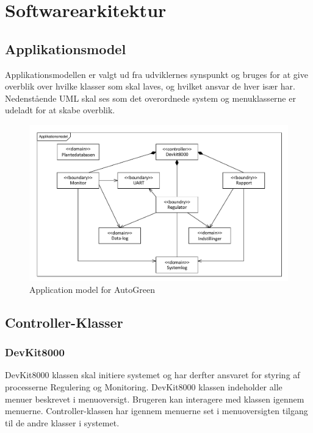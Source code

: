 \section{Softwarearkitektur}

\subsection{Applikationsmodel}

Applikationsmodellen er valgt ud fra udviklernes synspunkt og bruges for at give overblik over hvilke klasser som skal laves, og hvilket ansvar de hver især har. Nedenstående UML skal ses som det overordnede system og menuklasserne er udeladt for at skabe overblik. 

\begin{figure}[!h]
\centering 
\includegraphics[scale=0.8] {../fig/UML_autogreen.pdf}
\caption{Application model for AutoGreen}
\label{fig:UML}
\end{figure}

\subsection{Controller-Klasser}

\subsubsection{DevKit8000}

DevKit8000 klassen skal initiere systemet og har derfter ansvaret for styring af processerne Regulering og Monitoring.
DevKit8000 klassen indeholder alle menuer beskrevet i menuoversigt. Brugeren kan interagere med klassen igennem menuerne.
Controller-klassen har igennem menuerne set i menuoversigten tilgang til de andre klasser i systemet.

